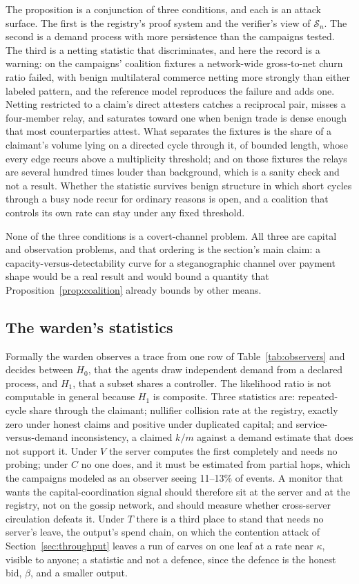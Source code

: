 \documentclass[11pt]{article}
\theoremstyle{plain}
\theoremstyle{definition}
\theoremstyle{remark}
\newcommand{\sett}{\mathcal{S}}
\begin{document}
The proposition is a conjunction of three conditions, and each is an attack surface. The first is the registry's proof system and the verifier's view of $\sett_n$. The second is a demand process with more persistence than the campaigns tested. The third is a netting statistic that discriminates, and here the record is a warning: on the campaigns' coalition fixtures a network-wide gross-to-net churn ratio failed, with benign multilateral commerce netting more strongly than either labeled pattern, and the reference model reproduces the failure and adds one. Netting restricted to a claim's direct attesters catches a reciprocal pair, misses a four-member relay, and saturates toward one when benign trade is dense enough that most counterparties attest. What separates the fixtures is the share of a claimant's volume lying on a directed cycle through it, of bounded length, whose every edge recurs above a multiplicity threshold; and on those fixtures the relays are several hundred times louder than background, which is a sanity check and not a result. Whether the statistic survives benign structure in which short cycles through a busy node recur for ordinary reasons is open, and a coalition that controls its own rate can stay under any fixed threshold.

None of the three conditions is a covert-channel problem. All three are capital and observation problems, and that ordering is the section's main claim: a capacity-versus-detectability curve for a steganographic channel over payment shape \citep{cachin1998information} would be a real result and would bound a quantity that Proposition~\ref{prop:coalition} already bounds by other means.

\subsection{The warden's statistics}

Formally the warden observes a trace from one row of Table~\ref{tab:observers} and decides between $H_0$, that the agents draw independent demand from a declared process, and $H_1$, that a subset shares a controller. The likelihood ratio is not computable in general because $H_1$ is composite. Three statistics are: repeated-cycle share through the claimant; nullifier collision rate at the registry, exactly zero under honest claims and positive under duplicated capital; and service-versus-demand inconsistency, a claimed $k/m$ against a demand estimate that does not support it. Under $V$ the server computes the first completely and needs no probing; under $C$ no one does, and it must be estimated from partial hops, which the campaigns modeled as an observer seeing 11--13\% of events. A monitor that wants the capital-coordination signal should therefore sit at the server and at the registry, not on the gossip network, and should measure whether cross-server circulation defeats it. Under $T$ there is a third place to stand that needs no server's leave, the output's spend chain, on which the contention attack of Section~\ref{sec:throughput} leaves a run of carves on one leaf at a rate near $\kappa$, visible to anyone; a statistic and not a defence, since the defence is the honest bid, $\beta$, and a smaller output.
\end{document}
